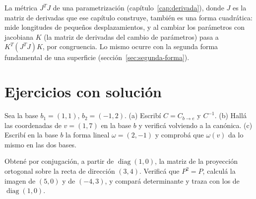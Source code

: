 La métrica \(J^TJ\) de una parametrización (capítulo~\ref{cap:derivada}), donde \(J\) es la
matriz de derivadas que ese capítulo construye, también es una forma cuadrática: mide
longitudes de pequeños
desplazamientos, y al cambiar los parámetros con jacobiana \(K\) (la matriz de derivadas del
cambio de parámetros) pasa a \(K^T(J^TJ)K\), por
congruencia. Lo mismo ocurre con la segunda forma fundamental de una superficie
(sección~\ref{sec:segunda-forma}).

\section{Ejercicios con solución}

\begin{ejercicio}\label{ex:cb-coordenadas}
Sea la base \(b_1=(1,1)\), \(b_2=(-1,2)\). (a) Escribí \(C=C_{b\to e}\) y \(C^{-1}\).
(b) Hallá las coordenadas de \(v=(1,7)\) en la base \(b\) y verificá volviendo a la canónica.
(c) Escribí en la base \(b\) la forma lineal \(\omega=(2,-1)\) y comprobá que \(\omega(v)\)
da lo mismo en las dos bases.
\end{ejercicio}

\begin{ejercicio}\label{ex:cb-proyeccion}
Obtené por conjugación, a partir de \(\operatorname{diag}(1,0)\), la matriz de la proyección
ortogonal sobre la recta de dirección \((3,4)\). Verificá que \(P^2=P\), calculá la imagen de
\((5,0)\) y de \((-4,3)\), y compará determinante y traza con los de \(\operatorname{diag}(1,0)\).
\end{ejercicio}

